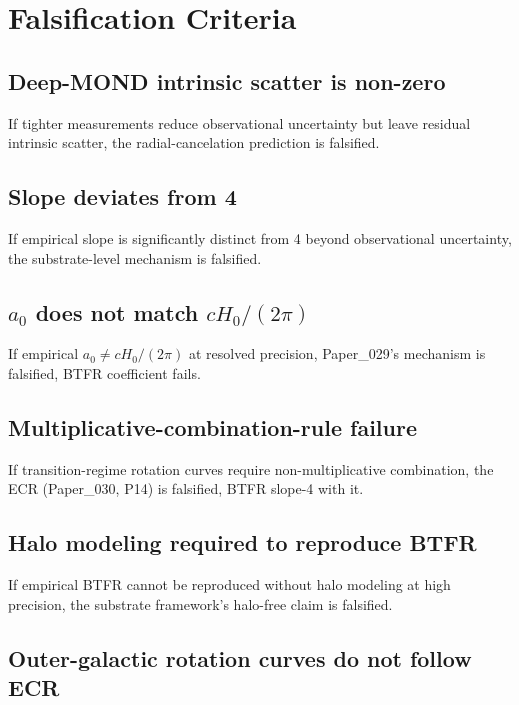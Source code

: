 \documentclass[11pt,a4paper]{article}
\begin{document}
\section{Falsification Criteria}

\subsection{Deep-MOND intrinsic scatter is non-zero}

If tighter measurements reduce observational uncertainty but leave residual intrinsic scatter, the radial-cancelation prediction is falsified.

\subsection{Slope deviates from 4}

If empirical slope is significantly distinct from 4 beyond observational uncertainty, the substrate-level mechanism is falsified.

\subsection{$a_0$ does not match $cH_0/(2\pi)$}

If empirical $a_0 \neq cH_0/(2\pi)$ at resolved precision, Paper\_029's mechanism is falsified, BTFR coefficient fails.

\subsection{Multiplicative-combination-rule failure}

If transition-regime rotation curves require non-multiplicative combination, the ECR (Paper\_030, P14) is falsified, BTFR slope-4 with it.

\subsection{Halo modeling required to reproduce BTFR}

If empirical BTFR cannot be reproduced without halo modeling at high precision, the substrate framework's halo-free claim is falsified.

\subsection{Outer-galactic rotation curves do not follow ECR}
\end{document}
